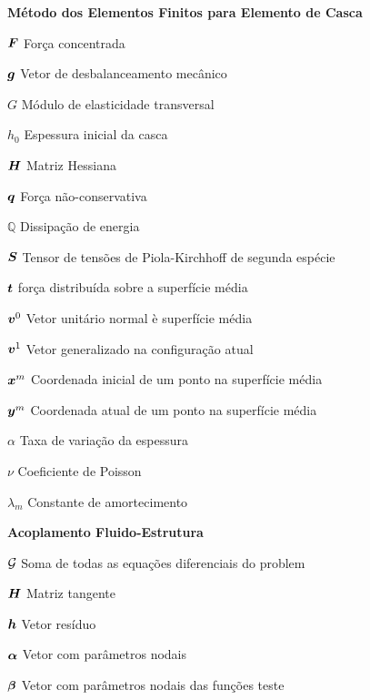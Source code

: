 \begin{simbolos}
    \item[\textbf{Método dos Elementos Finitos para Elemento de Casca}]
    \item[$\boldsymbol{F}$] Força concentrada
    \item[$\boldsymbol{g}$] Vetor de desbalanceamento mecânico
    \item[$G$] Módulo de elasticidade transversal
    \item[$h_0$] Espessura inicial da casca
    \item[$\boldsymbol{H}$] Matriz Hessiana
    \item[$\boldsymbol{q}$] Força não-conservativa
    \item[$\mathbb{Q}$] Dissipação de energia
    \item[$\boldsymbol{S}$] Tensor de tensões de Piola-Kirchhoff de segunda espécie
    \item[$\boldsymbol{t}$] força distribuída sobre a superfície média
    \item[$\boldsymbol{v}^0$] Vetor unitário normal è superfície média
    \item[$\boldsymbol{v}^1$] Vetor generalizado na configuração atual
    \item[$\boldsymbol{x}^m$] Coordenada inicial de um ponto na superfície média
    \item[$\boldsymbol{y}^m$] Coordenada atual de um ponto na superfície média
    \item[$\alpha$] Taxa de variação da espessura
    \item[$\nu$] Coeficiente de Poisson
    \item[$\lambda_m$] Constante de amortecimento

    \item[\textbf{Acoplamento Fluido-Estrutura}]
    \item[$\mathcal{G}$] Soma de todas as equações diferenciais do problem
    \item[$\boldsymbol{H}$] Matriz tangente
    \item[$\boldsymbol{h}$] Vetor resíduo
    \item[$\boldsymbol{\alpha}$] Vetor com parâmetros nodais
    \item[$\boldsymbol{\beta}$] Vetor com parâmetros nodais das funções teste


\end{simbolos}
